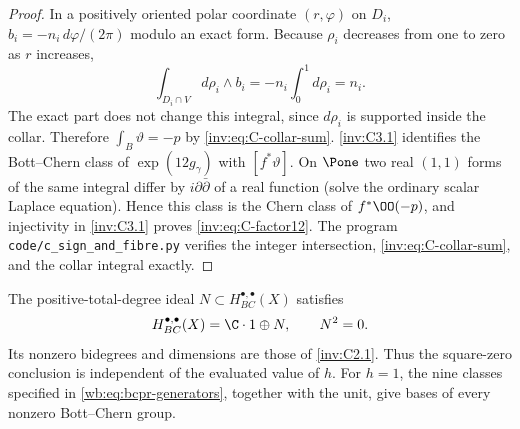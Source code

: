 \begin{proof}
In a positively oriented polar coordinate $(r,\varphi)$ on $D_i$,
$b_i=-n_i\,d\varphi/(2\pi)$ modulo an exact form.
Because $\rho_i$ decreases from one to zero as $r$ increases,
\[
\int_{D_i\cap V}d\rho_i\wedge b_i
=-n_i\int_0^1d\rho_i=n_i.
\]
The exact part does not change this integral, since $d\rho_i$ is
supported inside the collar.  Therefore
$\int_B\vartheta=-p$ by \eqref{inv:eq:C-collar-sum}.  \ref{inv:C3.1} identifies
the Bott--Chern class of $\exp(12g_\gamma)$ with $[f^*\vartheta]$.
On $\Pone$ two real $(1,1)$ forms of the same integral differ by
$i\partial\bar\partial$ of a real function (solve the ordinary
scalar Laplace equation).  Hence this class is the Chern class of
$f^*\OO(-p)$, and injectivity in \ref{inv:C3.1} proves
\eqref{inv:eq:C-factor12}.  The program
\texttt{code/c\_sign\_and\_fibre.py} verifies the integer
intersection, \eqref{inv:eq:C-collar-sum}, and the collar integral exactly.
\end{proof}

\begin{proposition}\label{inv:C3.3}\label{wb:thm:bcpr-square-zero-algebra}\label{wb:prop:bcpr-generators-are-bases}
The positive-total-degree ideal $N\subset H^{\bullet,\bullet}_{BC}(X)$
satisfies
\[
H^{\bullet,\bullet}_{BC}(X)=\C\cdot1\oplus N,\qquad N^2=0.
\]
Its nonzero bidegrees and dimensions are those of \ref{inv:C2.1}.  Thus the
square-zero conclusion is independent of the evaluated value of $h$.
For $h=1$, the nine classes specified in \eqref{wb:eq:bcpr-generators}, together with the unit, give bases of every nonzero Bott--Chern group.
\end{proposition}

